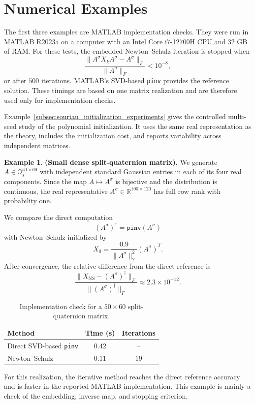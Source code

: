 \documentclass[12pt,a4paper]{article}
\theoremstyle{plain}
\theoremstyle{definition}
\newtheorem{example}[theorem]{Example}
\theoremstyle{remark}
\begin{document}
\section{Numerical Examples}
\label{sec:numerical}
The first three examples are MATLAB implementation checks. They were run in MATLAB R2023a on a computer with an Intel Core i7-12700H CPU and 32 GB of RAM. For these tests, the embedded Newton--Schulz iteration is stopped when
\[
    \frac{\|A^\sigma X_kA^\sigma-A^\sigma\|_F}{\|A^\sigma\|_F}<10^{-8},
\]
or after \(500\) iterations. MATLAB's SVD-based \texttt{pinv} provides the reference solution. These timings are based on one matrix realization and are therefore used only for implementation checks.

Example~\ref{subsec:souriau_initialization_experiments} gives the controlled multi-seed study of the polynomial initialization. It uses the same real representation as the theory, includes the initialization cost, and reports variability across independent matrices.

\begin{example}\label{subsec:ex1}
\textbf{(Small dense split-quaternion matrix).}
We generate $A\in\mathbb{Q}_s^{50\times60}$
with independent standard Gaussian entries in each of its four real components. Since the map \(A\mapsto A^\sigma\) is bijective and the distribution is continuous, the real representative $A^\sigma\in\mathbb{R}^{100\times120}$
has full row rank with probability one.

We compare the direct computation
\[
    (A^\sigma)^\dagger=\texttt{pinv}(A^\sigma)
\]
with Newton--Schulz initialized by
\[
    X_0=\frac{0.9}{\|A^\sigma\|_2^2}(A^\sigma)^T.
\]
After convergence, the relative difference from the direct reference is
\[
    \frac{\|X_{\mathrm{NS}}-(A^\sigma)^\dagger\|_F} {\|(A^\sigma)^\dagger\|_F} \approx 2.3\times10^{-12}.
\]

\begin{table}[H]
\centering
\caption{Implementation check for a \(50\times60\) split-quaternion matrix.}
\label{tab:small}
\begin{tabular}{lcc}
\toprule
Method & Time (s) & Iterations \\
\midrule
Direct SVD-based \texttt{pinv} & \(0.42\) & -- \\
Newton--Schulz & \(0.11\) & \(19\) \\
\bottomrule
\end{tabular}
\end{table}

For this realization, the iterative method reaches the direct reference accuracy and is faster in the reported MATLAB implementation. This example is mainly a check of the embedding, inverse map, and stopping criterion.
\end{example}
\end{document}
